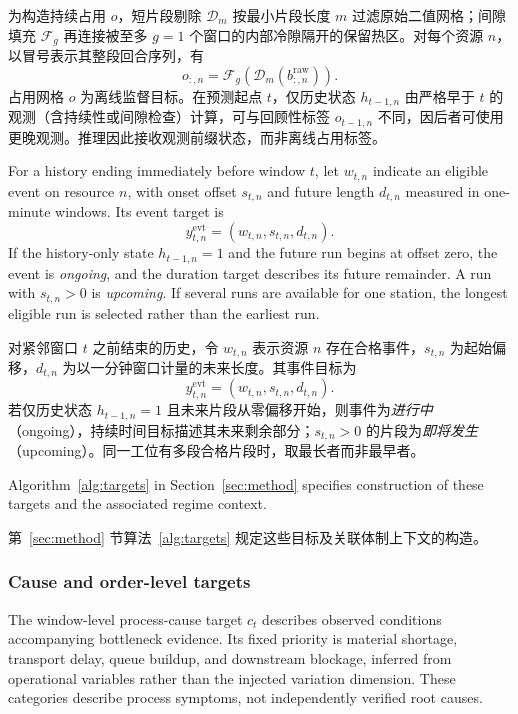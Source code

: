 \documentclass[a4paper,fleqn]{cas-dc}
\newcommand{\zhpara}[1]{%
  \par\begingroup\small\color{black!72}\noindent #1\par\endgroup}
\begin{document}
\zhpara{为构造持续占用 $o$，短片段剔除 $\mathcal{D}_{m}$ 按最小片段长度 $m$ 过滤原始二值网格；间隙填充 $\mathcal{F}_{g}$ 再连接被至多 $g=1$ 个窗口的内部冷隙隔开的保留热区。对每个资源 $n$，以冒号表示其整段回合序列，有
\begin{equation}
o_{:,n}=\mathcal{F}_{g}\!\left(\mathcal{D}_{m}
\left(b^{\mathrm{raw}}_{:,n}\right)\right).
\end{equation}
占用网格 $o$ 为离线监督目标。在预测起点 $t$，仅历史状态 $h_{t-1,n}$ 由严格早于 $t$ 的观测（含持续性或间隙检查）计算，可与回顾性标签 $o_{t-1,n}$ 不同，因后者可使用更晚观测。推理因此接收观测前缀状态，而非离线占用标签。}


For a history ending immediately before window $t$, let $w_{t,n}$ indicate an eligible event on resource $n$, with onset offset $s_{t,n}$ and future length $d_{t,n}$ measured in one-minute windows. Its event target is
\begin{equation}
y_{t,n}^{\mathrm{evt}}=(w_{t,n},s_{t,n},d_{t,n}).
\end{equation}
If the history-only state $h_{t-1,n}=1$ and the future run begins at offset zero, the event is \emph{ongoing}, and the duration target describes its future remainder. A run with $s_{t,n}>0$ is \emph{upcoming}. If several runs are available for one station, the longest eligible run is selected rather than the earliest run.

\zhpara{对紧邻窗口 $t$ 之前结束的历史，令 $w_{t,n}$ 表示资源 $n$ 存在合格事件，$s_{t,n}$ 为起始偏移，$d_{t,n}$ 为以一分钟窗口计量的未来长度。其事件目标为
\begin{equation}
y_{t,n}^{\mathrm{evt}}=(w_{t,n},s_{t,n},d_{t,n}).
\end{equation}
若仅历史状态 $h_{t-1,n}=1$ 且未来片段从零偏移开始，则事件为\emph{进行中}（ongoing），持续时间目标描述其未来剩余部分；$s_{t,n}>0$ 的片段为\emph{即将发生}（upcoming）。同一工位有多段合格片段时，取最长者而非最早者。}


Algorithm~\ref{alg:targets} in Section~\ref{sec:method} specifies construction of these targets and the associated regime context.

\zhpara{第~\ref{sec:method} 节算法~\ref{alg:targets} 规定这些目标及关联体制上下文的构造。}



\subsubsection{Cause and order-level targets}

The window-level process-cause target $c_t$ describes observed conditions accompanying bottleneck evidence. Its fixed priority is material shortage, transport delay, queue buildup, and downstream blockage, inferred from operational variables rather than the injected variation dimension. These categories describe process symptoms, not independently verified root causes.
\end{document}
